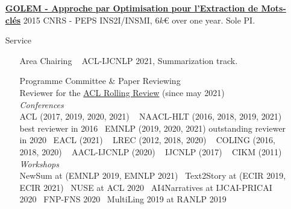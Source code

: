 \documentclass[11pt,a4paper]{article}
\begin{document}
\begin{itemize}
\href{http://boudinfl.github.io/golem/}{\textbf{GOLEM - Approche par Optimisation
pour l'Extraction de Mots-clés}} \hfill 2015 \newline
CNRS - PEPS INS2I/INSMI, 6$k$\euro{} over one year. Sole PI.

\item[Service]
\begin{itemize}[
font=\normalfont\bfseries,
itemsep=.1cm,
wide=0cm,
labelsep*=.1cm]

\item[Area Chairing] ~\newline
%
ACL-IJCNLP 2021, Summarization track.

\item[Programme Committee \& Paper Reviewing] ~\\[.2em]
  Reviewer for the \href{https://aclrollingreview.org/}{ACL Rolling Review} (since may 2021)\\[.2em]
  \textit{Conferences} \\[.2em]
  \hspace*{1em} ACL (2017, 2019, 2020, 2021) ~\newline
  \hspace*{1em} NAACL-HLT (2016, 2018, 2019, 2021) \hfill best reviewer in 2016~\newline
  \hspace*{1em} EMNLP (2019, 2020, 2021) \hfill outstanding reviewer in 2020~\newline
  \hspace*{1em} EACL (2021) ~\newline
  \hspace*{1em} LREC (2012, 2018, 2020) ~\newline
  \hspace*{1em} COLING (2016, 2018, 2020) ~\newline
  \hspace*{1em} AACL-IJCNLP (2020) ~\newline
  \hspace*{1em} IJCNLP (2017) ~\newline
  \hspace*{1em} CIKM (2011) \\[.5em]
  \textit{Workshops} \\[.2em]
  \hspace*{1em} NewSum at (EMNLP 2019, EMNLP 2021)~\newline
  \hspace*{1em} Text2Story at (ECIR 2019, ECIR 2021)~\newline
  \hspace*{1em} NUSE at ACL 2020~\newline
  \hspace*{1em} AI4Narratives at IJCAI-PRICAI 2020~\newline
  \hspace*{1em} FNP-FNS 2020~\newline
  \hspace*{1em} MultiLing 2019 at RANLP 2019~\newline


\end{itemize}
\end{itemize}
\end{document}
